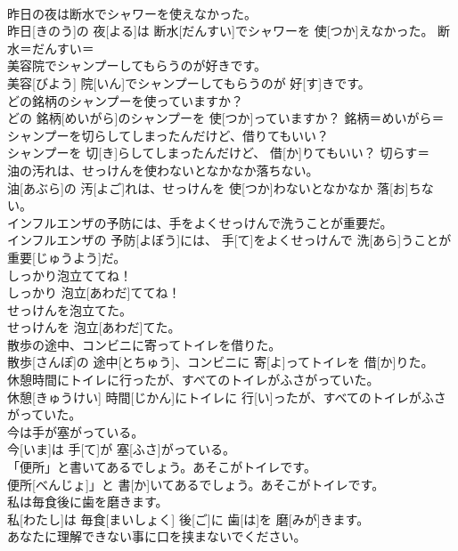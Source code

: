 \documentclass[8pt]{extreport}
\begin{document}
\begin{CJK}{UTF8}{min}
\\	昨日の夜は断水でシャワーを使えなかった。	
\\	昨日[きのう]の 夜[よる]は 断水[だんすい]でシャワーを 使[つか]えなかった。	断水＝だんすい＝
\\	美容院でシャンプーしてもらうのが好きです。	
\\	美容[びよう] 院[いん]でシャンプーしてもらうのが 好[す]きです。	
\\	どの銘柄のシャンプーを使っていますか？	
\\	どの 銘柄[めいがら]のシャンプーを 使[つか]っていますか？	銘柄＝めいがら＝ 
\\	シャンプーを切らしてしまったんだけど、借りてもいい？	
\\	シャンプーを 切[き]らしてしまったんだけど、 借[か]りてもいい？	切らす＝ 
\\	油の汚れは、せっけんを使わないとなかなか落ちない。	
\\	油[あぶら]の 汚[よご]れは、せっけんを 使[つか]わないとなかなか 落[お]ちない。	
\\	インフルエンザの予防には、手をよくせっけんで洗うことが重要だ。	
\\	インフルエンザの 予防[よぼう]には、 手[て]をよくせっけんで 洗[あら]うことが 重要[じゅうよう]だ。	
\\	しっかり泡立ててね！	
\\	しっかり 泡立[あわだ]ててね！	
\\	せっけんを泡立てた。	
\\	せっけんを 泡立[あわだ]てた。	
\\	散歩の途中、コンビニに寄ってトイレを借りた。	
\\	散歩[さんぽ]の 途中[とちゅう]、コンビニに 寄[よ]ってトイレを 借[か]りた。	
\\	休憩時間にトイレに行ったが、すべてのトイレがふさがっていた。	
\\	休憩[きゅうけい] 時間[じかん]にトイレに 行[い]ったが、すべてのトイレがふさがっていた。	
\\	今は手が塞がっている。	
\\	今[いま]は 手[て]が 塞[ふさ]がっている。	
\\	「便所」と書いてあるでしょう。あそこがトイレです。	
\\	便所[べんじょ]」と 書[か]いてあるでしょう。あそこがトイレです。	
\\	私は毎食後に歯を磨きます。	
\\	私[わたし]は 毎食[まいしょく] 後[ご]に 歯[は]を 磨[みが]きます。	
\\	あなたに理解できない事に口を挟まないでください。	

\end{CJK}
\end{document}
